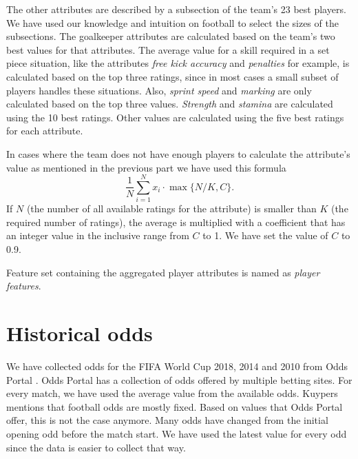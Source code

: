 The other attributes are described by a subsection of the team's 23 best players. We have used our knowledge and intuition on football to select the sizes of the subsections. The goalkeeper attributes are calculated based on the team's two best values for that attributes. The average value for a skill required in a set piece situation, like the attributes \textit{free kick accuracy} and \textit{penalties} for example, is calculated based on the top three ratings, since in most cases a small subset of players handles these situations. Also, \textit{sprint speed} and \textit{marking} are only calculated based on the top three values. \textit{Strength} and \textit{stamina} are calculated using the 10 best ratings. Other values are calculated using the five best ratings for each attribute.

In cases where the team does not have enough players to calculate the attribute's value as mentioned in the previous part we have used this formula
\begin{equation}
\frac{1}{N}\sum_{i=1}^{N}x_i \cdot \max{\{N/K, C\}}.
\end{equation}
If $N$ (the number of all available ratings for the attribute) is smaller than $K$ (the required number of ratings), the average is multiplied with a coefficient that has an integer value in the inclusive range from $C$ to 1. We have set the value of $C$ to 0.9.

Feature set containing the aggregated player attributes is named as \textit{player features}.

\section{Historical odds}
We have collected odds for the FIFA World Cup 2018, 2014 and 2010 from Odds Portal \cite{oddsportal}. Odds Portal has a collection of odds offered by multiple betting sites. For every match, we have used the average value from the available odds. Kuypers \cite{kuypers2008} mentions that football odds are mostly fixed. Based on values that Odds Portal offer, this is not the case anymore. Many odds have changed from the initial opening odd before the match start. We have used the latest value for every odd since the data is easier to collect that way.

